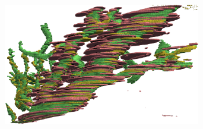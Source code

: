   \begin{figure}[!t]
    \centering
    \includegraphics[width=3.4in]{3_results/Figs/vessel_overlay}
    \caption{}
    \label{fig:}
  \end{figure}
